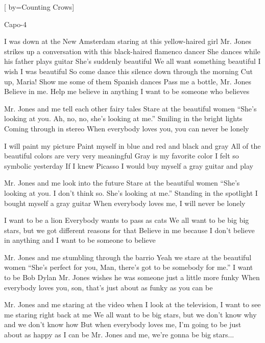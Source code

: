 [
	by={Counting Crows}]

Capo-4

\chordson

\beginverse
I was down at the New Amsterdam 
staring at this yellow-haired girl
Mr. Jones strikes up a conversation 
with this black-haired flamenco dancer
She dances while his father plays guitar
She's suddenly beautiful
We all want something beautiful
I wish I was beautiful
So come dance this silence down through the morning
Cut up, Maria! Show me some of them Spanish dances
Pass me a bottle, Mr. Jones
Believe in me. Help me believe in anything
I want to be someone who believes
\endverse

\beginchorus
Mr. Jones and me tell each other fairy tales
Stare at the beautiful women
``She's looking at you. Ah, no, no, she's looking at me.''
Smiling in the bright lights
Coming through in stereo
When everybody loves you, you can never be lonely
\endchorus

\chordsoff
\beginverse
I will paint my picture
Paint myself in blue and red and black and gray
All of the beautiful colors are very very meaningful
Gray is my favorite color
I felt so symbolic yesterday
If I knew Picasso
I would buy myself a gray guitar and play
\endverse

\beginchorus
Mr. Jones and me look into the future
Stare at the beautiful women
``She's looking at you.
I don't think so. She's looking at me.''
Standing in the spotlight
I bought myself a gray guitar
When everybody loves me, I will never be lonely
\endchorus

\beginverse
I want to be a lion
Everybody wants to pass as cats
We all want to be big big stars, but we got different
reasons for that
Believe in me because I don't believe in anything
and I want to be someone to believe
\endverse

\beginchorus
Mr. Jones and me stumbling through the barrio
Yeah we stare at the beautiful women
``She's perfect for you, Man, there's got to be somebody for me.''
I want to be Bob Dylan
Mr. Jones wishes he was someone just a little more funky
When everybody loves you, son, that's just about as
funky as you can be
\endchorus

\beginchorus
Mr. Jones and me staring at the video
when I look at the television, I want to see me staring
right back at me
We all want to be big stars, but we don't know why
and we don't know how
But when everybody loves me, I'm going to be just
about as happy as I can be
Mr. Jones and me, we're gonna be big stars...
\endchorus
\vspace{3cm}

\endsong
